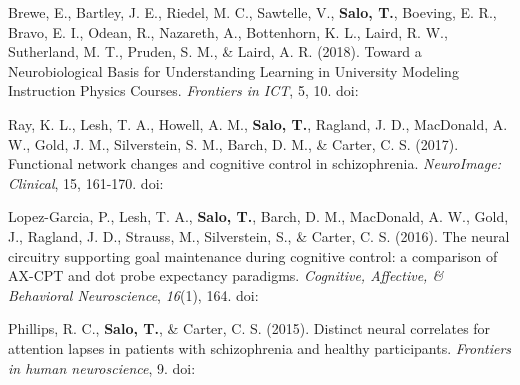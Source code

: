 \documentclass[10pt]{article}
\newcommand{\sectionstyle}{\LARGE \fontfamily{lmr}\selectfont}
\newcommand{\textlink}[3][blue]{\href{#2}{\color{#1}{#3}}}
\begin{document}
\begin{hangparas}{.25in}{1}
Brewe, E., Bartley, J. E., Riedel, M. C., Sawtelle, V., \textbf{Salo, T.},
Boeving, E. R., Bravo, E. I., Odean, R., Nazareth, A., Bottenhorn, K. L.,
Laird, R. W., Sutherland, M. T., Pruden, S. M., \& Laird, A. R. (2018).
Toward a Neurobiological Basis for Understanding Learning in University Modeling
Instruction Physics Courses. \emph{Frontiers in ICT}, 5, 10.
doi:\textlink{https://doi.org/10.3389/fict.2018.00010}{10.3389/fict.2018.00010}

\bigskip

Ray, K. L., Lesh, T. A., Howell, A. M., \textbf{Salo, T.}, Ragland, J. D.,
MacDonald, A. W., Gold, J. M., Silverstein, S. M., Barch, D. M., \& Carter,
C. S. (2017). Functional network changes and cognitive control in schizophrenia.
\emph{NeuroImage: Clinical}, 15, 161-170.
doi:\textlink{https://doi.org/10.1016/j.nicl.2017.05.001}{10.1016/j.nicl.2017.05.001}

\bigskip

Lopez-Garcia, P., Lesh, T. A., \textbf{Salo, T.}, Barch, D. M., MacDonald,
A. W., Gold, J., Ragland, J. D., Strauss, M., Silverstein, S., \& Carter, C. S.
(2016). The neural circuitry supporting goal maintenance during cognitive
control: a comparison of AX-CPT and dot probe expectancy paradigms.
\emph{Cognitive, Affective, \& Behavioral Neuroscience}, \emph{16}(1), 164.
doi:\textlink{https://doi.org/10.3758/s13415-015-0384-1}{10.3758/s13415-015-0384-1}

\bigskip

Phillips, R. C., \textbf{Salo, T.}, \& Carter, C. S. (2015). Distinct neural
correlates for attention lapses in patients with schizophrenia and healthy
participants. \emph{Frontiers in human neuroscience}, 9.
doi:\textlink{https://doi.org/10.3389/fnhum.2015.00502}{10.3389/fnhum.2015.00502}

\end{hangparas}

\bigskip

\begin{center}\sectionstyle{PRESENTATIONS}\end{center}
\end{document}
